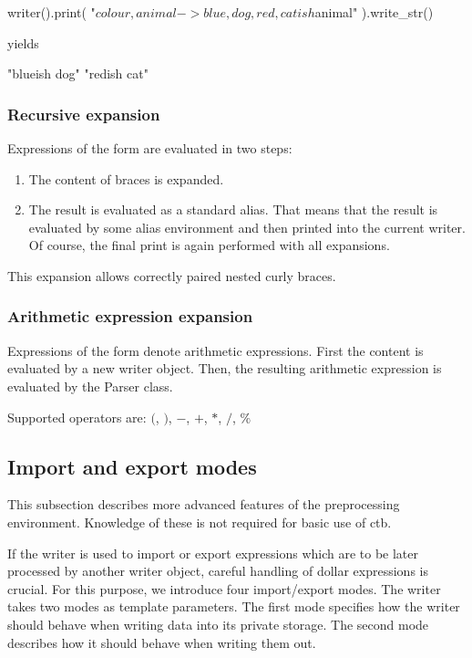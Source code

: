 \mybeginfig
\begin{code}
writer().print(
  "${ colour,animal ->blue,dog,red,cat}ish $animal"
).write_str()
\end{code}
yields
\begin{code}
"blueish dog"
"redish cat"
\end{code}


\subsubsection{Recursive expansion}
Expressions of the form  are evaluated in two steps:
\begin{enumerate}
  \item The content of braces is expanded.
  \item The result is evaluated as a standard alias. That means that the result is evaluated by some alias environment and then printed into the current writer. Of course, the final print is again performed with all expansions.
\end{enumerate}

This expansion allows correctly paired nested curly braces.

\subsubsection{Arithmetic expression expansion}

Expressions of the form  denote arithmetic expressions. First the content is evaluated by a new writer object. Then, the resulting arithmetic expression is evaluated by the Parser class.

Supported operators are: $($, $)$, $-$, $+$, $*$, $/$, $\%$


\subsection*{Import and export modes}

\begin{rem}
  This subsection describes more advanced features of the preprocessing environment. Knowledge of these is not required for basic use of ctb.
\end{rem}

If the writer is used to import or export expressions which are to be later processed by another writer object, careful handling of dollar expressions is crucial. For this purpose, we introduce four import/export modes. The writer takes two modes as template parameters. The first mode specifies how the writer should behave when writing data into its private storage. The second mode describes how it should behave when writing them out.

